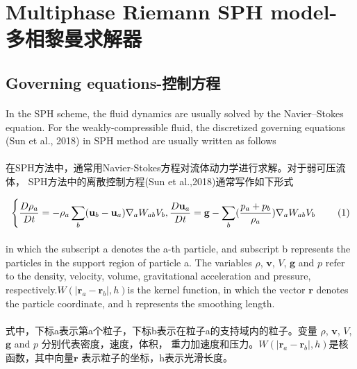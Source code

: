 \documentclass[UTF8]{ctexart}
\begin{document}
\section{Multiphase Riemann SPH model-多相黎曼求解器}

\subsection{Governing equations-控制方程}
\paragraph{\quad}In the SPH scheme, the fluid dynamics are usually solved 
                by the Navier–Stokes equation. For the weakly-compressible fluid, 
                the discretized governing equations (Sun et al., 2018) in SPH 
                method are usually written as follows
\paragraph{\quad}在SPH方法中，通常用Navier-Stokes方程对流体动力学进行求解。对于弱可压流体，
                SPH方法中的离散控制方程(Sun et al.,2018)通常写作如下形式

\begin{equation}
   \left\{ \frac{D \rho_a}{Dt}=-\rho_a\sum_{b}(\mathbf{u}_b - \mathbf{u}_a)\nabla_a W_{ab}V_b ,\\
   \frac{D \mathbf{u}_a}{Dt}=\mathbf{g}-\sum_{b}(\frac{p_a+p_b}{\rho_a})\nabla_a W_{ab} V_b \right. \qquad(1)
\end{equation}

\paragraph{\quad}in which the subscript a denotes the a-th particle, and subscript
                 b represents the particles in the support region of particle a. 
                 The variables $\rho$, $\mathbf{v}$, $V$, $\mathbf{g}$ and $p$ refer 
                 to the density, velocity, volume, gravitational acceleration and 
                 pressure, respectively.$W(|\mathbf{r}_a-\mathbf{r}_b|, h) $is the kernel function, 
                 in which the vector $\mathbf{r}$ denotes the particle coordinate, and h 
                 represents the smoothing length.
\paragraph{\quad}式中，下标a表示第a个粒子，下标b表示在粒子a的支持域内的粒子。变量
                $\rho$, $\mathbf{v}$, $V$, $\mathbf{g}$ and $p$ 分别代表密度，速度，体积，
                重力加速度和压力。$W(|\mathbf{r}_a-\mathbf{r}_b|, h) $是核函数，其中向量$\mathbf{r}$
                表示粒子的坐标，h表示光滑长度。
\end{document}
